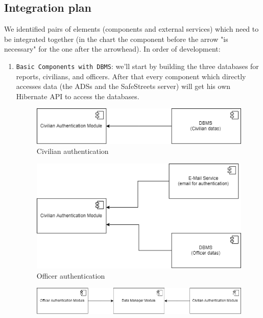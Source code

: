 \documentclass[12pt,a4paper]{article}
\begin{document}
\subsection{Integration plan}
We identified pairs of elements (components and external services) which need to be integrated together (in the chart the component before the arrow "is necessary" for the one after the arrowhead). In order of development:
\begin{enumerate}
\item \texttt{Basic Components with DBMS}: we'll start by building the three databases for reports, civilians, and officers. After that every component which directly accesses data (the ADSs and the SafeStreets server) will get his own Hibernate API to access the databases. 
\\
\begin{figure}[H]
		\centering
			\includegraphics[width=1.0\linewidth]{Images/Integration/BasicIntegrationChart1}
		\caption{Civilian authentication}
\end{figure}
\begin{figure}[H]
		\centering
			\includegraphics[width=1.0\linewidth]{Images/Integration/BasicIntegrationChart2}
		\caption{Officer authentication}
\end{figure}
\begin{figure}[H]
		\centering
			\includegraphics[width=1.0\linewidth]{Images/Integration/BasicIntegrationChart3}

\end{figure}
\end{enumerate}
\end{document}
